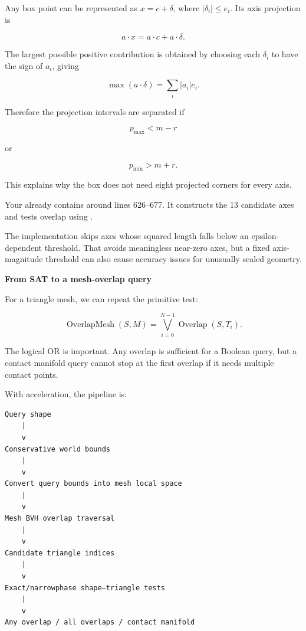 Any box point can be represented as \(x=c+\delta\), where \(|\delta_i|\le e_i\). Its axis projection is

\[
a\cdot x=a\cdot c+a\cdot\delta.
\]

The largest possible positive contribution is obtained by choosing each \(\delta_i\) to have the sign of \(a_i\), giving

\[
\max(a\cdot\delta)=\sum_i |a_i|e_i.
\]

Therefore the projection intervals are separated if

\[
p_{\max}<m-r
\]

or

\[
p_{\min}>m+r.
\]

This explains why the box does not need eight projected corners for every axis.

Your  already contains  around lines 626--677. It constructs the 13 candidate axes and tests overlap using .

The implementation skips axes whose squared length falls below an epsilon-dependent threshold. That avoids meaningless near-zero axes, but a fixed axis-magnitude threshold can also cause accuracy issues for unusually scaled geometry.

\textbf{From SAT to a mesh-overlap query}

For a triangle mesh, we can repeat the primitive test:

\[
\operatorname{OverlapMesh}(S,M) = \bigvee_{i=0}^{N-1}\operatorname{Overlap}(S,T_i).
\]

The logical OR is important. Any overlap is sufficient for a Boolean query, but a contact manifold query cannot stop at the first overlap if it needs multiple contact points.

With acceleration, the pipeline is:

\begin{verbatim}
Query shape
    |
    v
Conservative world bounds
    |
    v
Convert query bounds into mesh local space
    |
    v
Mesh BVH overlap traversal
    |
    v
Candidate triangle indices
    |
    v
Exact/narrowphase shape–triangle tests
    |
    v
Any overlap / all overlaps / contact manifold
\end{verbatim}

